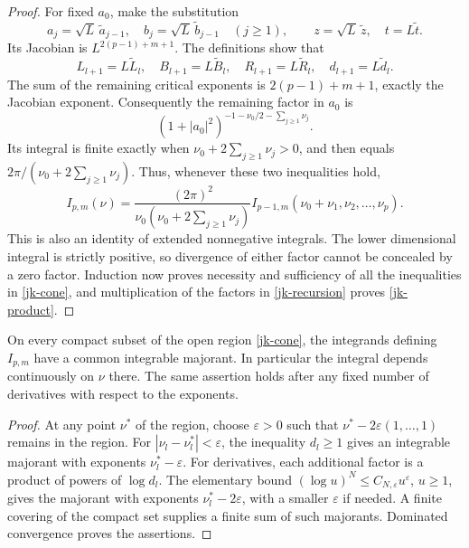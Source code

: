 \begin{proof}
For fixed \(a_0\), make the substitution
\[
 a_j=\sqrt L\,\widetilde a_{j-1},\quad
 b_j=\sqrt L\,\widetilde b_{j-1}\quad(j\geq1),\qquad
 z=\sqrt L\,\widetilde z,\quad t=L\widetilde t.
\]
Its Jacobian is \(L^{2(p-1)+m+1}\).  The definitions show that
\[
 L_{l+1}=L\widetilde L_l,\quad
 B_{l+1}=L\widetilde B_l,\quad
 R_{l+1}=L\widetilde R_l,\quad
 d_{l+1}=L\widetilde d_l.
\]
The sum of the remaining critical exponents is
\(2(p-1)+m+1\), exactly the Jacobian exponent.
Consequently the remaining factor in \(a_0\) is
\[
 (1+|a_0|^2)^{-1-\nu_0/2-\sum_{j\geq1}\nu_j}.
\]
Its integral is finite exactly when
\(\nu_0+2\sum_{j\geq1}\nu_j>0\), and then equals
\(2\pi/(\nu_0+2\sum_{j\geq1}\nu_j)\).
Thus, whenever these two inequalities hold,
\begin{equation}\label{jk-recursion}
 I_{p,m}(\nu)=
 \frac{(2\pi)^2}
      {\nu_0(\nu_0+2\sum_{j\geq1}\nu_j)}
 I_{p-1,m}(\nu_0+\nu_1,\nu_2,\ldots,\nu_p).
\end{equation}
This is also an identity of extended nonnegative integrals.
The lower dimensional integral is strictly positive, so divergence
of either factor cannot be concealed by a zero factor.
Induction now proves necessity and sufficiency of all the
inequalities in \eqref{jk-cone}, and multiplication of the factors
in \eqref{jk-recursion} proves \eqref{jk-product}.
\end{proof}

\begin{corollary}\label{jk-uniform}
On every compact subset of the open region \eqref{jk-cone},
the integrands defining \(I_{p,m}\) have a common integrable
majorant.  In particular the integral depends continuously on
\(\nu\) there.  The same assertion holds after any fixed number of
derivatives with respect to the exponents.
\end{corollary}

\begin{proof}
At any point \(\nu^*\) of the region, choose \(\varepsilon>0\)
such that \(\nu^*-2\varepsilon(1,\ldots,1)\) remains in the region.
For \(|\nu_l-\nu_l^*|<\varepsilon\), the inequality \(d_l\geq1\)
gives an integrable majorant with exponents
\(\nu_l^*-\varepsilon\).
For derivatives, each additional factor is a product of powers
of \(\log d_l\).  The elementary bound
\((\log u)^N\leq C_{N,\varepsilon}u^\varepsilon\), \(u\geq1\),
gives the majorant with exponents
\(\nu_l^*-2\varepsilon\), with a smaller \(\varepsilon\) if needed.
A finite covering of the compact set supplies a finite sum of
such majorants.  Dominated convergence proves the assertions.
\end{proof}

